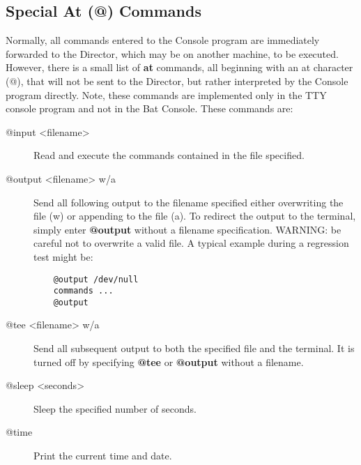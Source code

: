 \subsection{Special At (@) Commands}
\label{atcommands}

Normally, all commands entered to the Console program are immediately
forwarded to the Director, which may be on another machine, to be executed.
However, there is a small list of {\bf at} commands, all beginning with an at
character (@), that will not be sent to the Director, but rather interpreted
by the Console program directly. Note, these commands are implemented only in
the TTY console program and not in the Bat Console. These commands are:

\begin{description}

\item [@input {\textless}filename{\textgreater}]
   Read and execute the commands  contained in the file specified.

\item [@output {\textless}filename{\textgreater} w/a]
   Send all following output to the  filename specified either overwriting the
file (w) or appending to  the file (a). To redirect the output to the
terminal, simply enter  {\bf @output} without a filename specification.
WARNING: be careful  not to overwrite a valid file. A typical example during a
regression  test might be:

\footnotesize
\begin{verbatim}
    @output /dev/null
    commands ...
    @output

\end{verbatim}
\normalsize

\item [@tee {\textless}filename{\textgreater} w/a]
   Send all subsequent output to  both the specified file and the terminal. It is
   turned off by  specifying {\bf @tee} or {\bf @output} without a filename.

\item [@sleep {\textless}seconds{\textgreater}]
   Sleep the specified number of seconds.

\item [@time]
   Print the current time and date.


\end{description}
